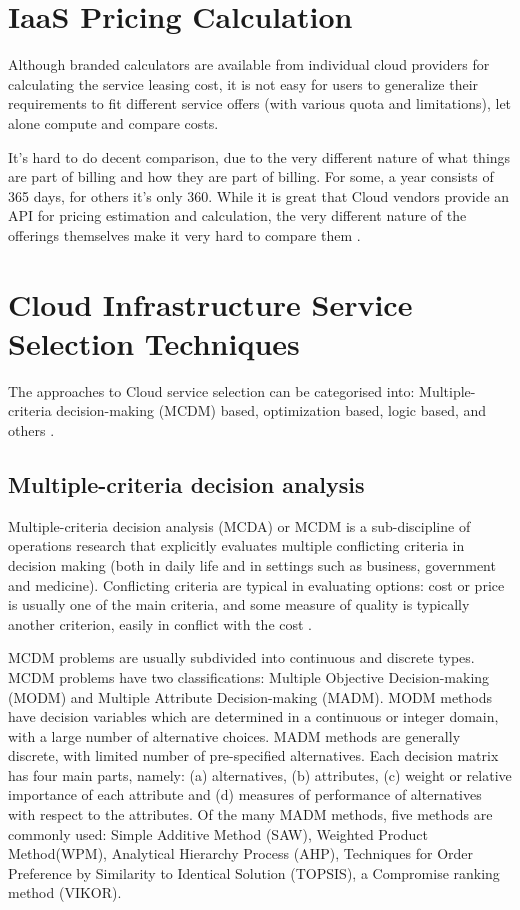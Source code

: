 \section{IaaS Pricing Calculation}
Although branded calculators are available from individual cloud providers
\cite{AWSCalculator, AzurePricingCalculator, GooglePricingCalculator, RackspaceCalculator, SoftLayerCalculator}
for calculating the service leasing cost, it is not easy for users to
generalize their requirements to fit different service offers (with
various quota and limitations), let alone compute and compare
costs. 

It's hard to do decent comparison, due to the very different nature of what things are part of billing and how they are part of billing. For some, a year consists of 365 days, for others it's only 360. While it is great that Cloud vendors provide an API for pricing estimation and calculation, the very different nature of the offerings themselves make it very hard to compare them \cite{Cloudorado}.

\section{Cloud Infrastructure Service Selection Techniques}
The approaches to Cloud service selection can be categorised into:
Multiple-criteria decision-making (MCDM) based, optimization based, logic based, and others \cite{SUN2014134}.

\subsection{Multiple-criteria decision analysis}
\label{sec:MCDA}
Multiple-criteria decision analysis (MCDA) or MCDM is a sub-discipline of operations research that explicitly evaluates multiple conflicting criteria in decision making (both in daily life and in settings such as business, government and medicine). Conflicting criteria are typical in evaluating options: cost or price is usually one of the main criteria, and some measure of quality is typically another criterion, easily in conflict with the cost \cite{MCDA}.

MCDM problems are usually subdivided into continuous and discrete types. MCDM problems have two classifications: Multiple Objective Decision-making (MODM) and Multiple Attribute Decision-making (MADM). MODM methods have decision variables which are determined in a continuous or integer domain, with a large number of alternative choices. MADM methods are generally discrete, with limited number of pre-specified alternatives. Each decision matrix has four main parts, namely: (a) alternatives, (b) attributes, (c) weight or relative importance of each attribute and (d) measures of performance of alternatives with respect to the attributes\cite{MCDM}. 
Of the many MADM methods, five methods are commonly used: Simple Additive Method (SAW), Weighted Product Method(WPM), Analytical Hierarchy Process (AHP), Techniques for Order Preference by Similarity to Identical Solution (TOPSIS), a Compromise ranking method (VIKOR).


